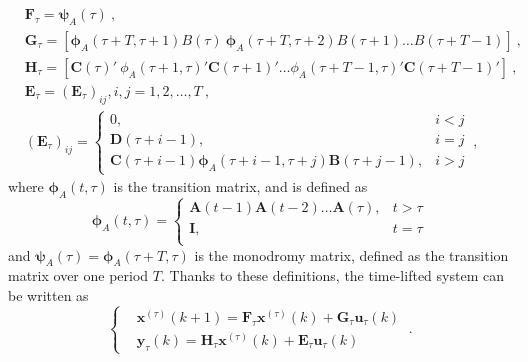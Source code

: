 \begin{equation} \label{eq:4.6}
\begin{split}
    &\boldsymbol{F}_{\tau}=\boldsymbol{\psi}_A(\tau) \ , \\
    &\boldsymbol{G}_{\tau}=[\boldsymbol{\phi}_A(\tau+T,\tau+1)B(\tau) \ \boldsymbol{\phi}_A(\tau+T,\tau+2)B(\tau+1) \dots 
    B(\tau+T-1)] \ , \\
    &\boldsymbol{H}_{\tau}=[\boldsymbol{C}(\tau)' \
    \phi_A(\tau+1,\tau)'\boldsymbol{C}(\tau+1)' \dots
    \phi_A(\tau+T-1,\tau)'\boldsymbol{C}(\tau+T-1)'] \ , \\
    &\boldsymbol{E}_{\tau} = {(\boldsymbol{E}_{\tau})_{ij}},  i,j=1,2,\dots,T  \ ,  \\
    &(\boldsymbol{E}_{\tau})_{ij} =
    \begin{cases}
      0, & i<j\\
      \boldsymbol{D}(\tau+i-1), & i=j\\
      \boldsymbol{C}(\tau+i-1)\boldsymbol{\phi}_A(\tau+i-1,\tau+j) \boldsymbol{B}(\tau+j-1), & i>j
    \end{cases} \ ,  
\end{split}
\end{equation}
where $\boldsymbol{\phi}_A(t,\tau)$ is the transition matrix, and is defined as
\begin{equation} \label{eq:4.7}
    \boldsymbol{\phi}_A(t, \tau) = 
    \begin{cases}
      \boldsymbol{A}(t-1)\boldsymbol{A}(t-2)\dots \boldsymbol{A}(\tau), & t>\tau\\
      \boldsymbol{I}, & t=\tau\\
    \end{cases}  
\end{equation}
and $\boldsymbol{\psi}_A(\tau)=\boldsymbol{\phi}_A(\tau+T,\tau)$ is the monodromy matrix, defined as the transition matrix over one period $T$.
Thanks to these definitions, the time-lifted system can be written as
\begin{equation} \label{eq:4.8}
\begin{cases}
      &\boldsymbol{x}^{(\tau)}(k+1)=\boldsymbol{F}_{\tau}\boldsymbol{x}^{(\tau)}(k)+\boldsymbol{G}_{\tau}\boldsymbol{u}_{\tau}(k)\\
      &\boldsymbol{y}_{\tau}(k)=\boldsymbol{H}_{\tau}\boldsymbol{x}^{(\tau)}(k)+\boldsymbol{E}_{\tau}\boldsymbol{u}_{\tau}(k)
\end{cases} \ .
\end{equation}



